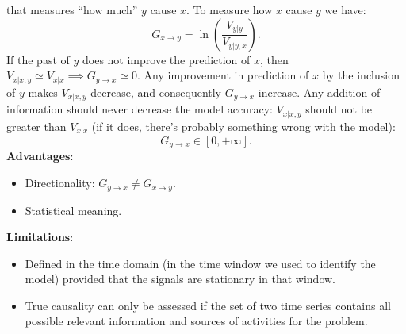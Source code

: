 \documentclass[10pt, letterpaper]{report}
\begin{document}
that measures ``how much'' $y$ cause $x$. To measure how $x$ cause $y$ we have:\begin{equation}
     G_{x\rightarrow y}=\ln\left(
          \frac{V_{y|y}}{V_{y|y,x}}
     \right).
\end{equation}
If the past of $y$ does not improve the prediction of $x$, then $V_{x|x,y}\simeq V_{x|x}\implies G_{y\rightarrow x}\simeq 0$. Any improvement in prediction of $x$ by the inclusion of $y$ makes $V_{x|x,y}$ decrease, and consequently $G_{y\rightarrow x}$ increase. Any addition of information should never decrease the model accuracy: $V_{x|x,y}$  should not be greater than $V_{x|x}$ (if it does, there's probably something wrong with the model):\begin{equation}
     G_{y\rightarrow x}\in [0,+\infty].
\end{equation}
\textbf{Advantages}:\begin{itemize}
     \item Directionality: $G_{y\rightarrow x}\ne  G_{x\rightarrow y}$. 
     \item Statistical meaning.
\end{itemize}
\textbf{Limitations}:\begin{itemize}
     \item Defined in the time domain (in the time window we used to
identify the model) provided that the signals are stationary in
that window.
     \item True causality can only be assessed if the set of two time series
contains all possible relevant information and sources of
activities for the problem.
\end{itemize}
\end{document}
